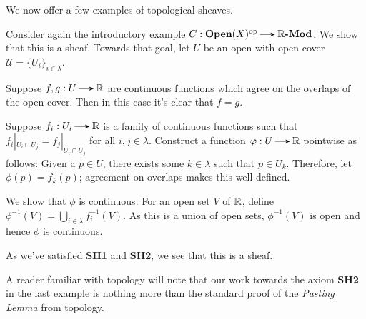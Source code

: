 We now offer a few examples of topological sheaves.

\begin{example}
    Consider again the introductory example $C: \textbf{Open}(X)\op \to \rr\textbf{-Mod}$. 
    We show that this is a sheaf. Towards that goal, let $U$ be an open with open cover
    $\mathcal{U} = \{U_i\}_{i \in \lambda}$.
    
    \begin{description}
        \itemsep 0.25cm
        \item[\textbf{(SH1)}]
        Suppose $f, g: U \to \rr$ are continuous functions which agree on the 
        overlaps of the open cover. Then in this case it's clear that $f = g$. 

        \item[\textbf{(SH2)}]
        Suppose $f_i: U_i \to \rr$ is a family of continuous functions such that 
        $f_i|_{U_i \cap U_j} = f_j|_{U_i \cap U_j}$ for all $i, j \in \lambda$. 
        Construct a function $\phi: U \to \rr$ pointwise as follows: Given a $p \in U$, 
        there exists some $k \in \lambda$ such that
        $p \in U_k$. Therefore, let $\phi(p) = f_k(p)$; agreement on overlaps 
        makes this well defined.


        We show that $\phi$ is continuous.
        For an open set $V$ of $\mathbb{R}$, define $\phi^{-1}(V) = \bigcup_{i \in \lambda}f_i^{-1}(V)$.
        As this is a union of open sets, $\phi^{-1}(V)$ is open and hence $\phi$ is continuous.
    \end{description}
    As we've satisfied \textbf{SH1} and \textbf{SH2}, we see that this is a sheaf.
\end{example}

A reader familiar with topology will note that our work towards the axiom 
\textbf{SH2} in the last example is nothing more than the standard proof of the 
\emph{Pasting Lemma} from topology. 


